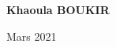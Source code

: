 
\begin{titlepage}

\begin{center}


\HRule \\[0.5cm] %
{\huge \bfseries \ttitle\par}\vspace{0.4cm} %
\HRule \\[0.5cm] %



 \vspace{5cm} 
\begin{minipage}[t]{0.7\textwidth}
\begin{center} 
	
	
	
	\textbf{\huge {Khaoula BOUKIR}}{\authorname} 
	
	\vspace{3cm}
	
	{\Large Mars 2021}

\end{center}
\end{minipage}
\end{center}

\end{titlepage}